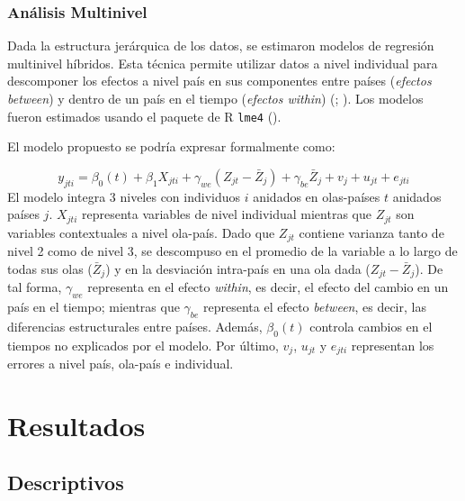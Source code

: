 \documentclass[
  spanish,
  letterpaper,
  DIV=11,
  numbers=noendperiod]{scrartcl}
\begin{document}
\subsubsection{Análisis Multinivel}\label{anuxe1lisis-multinivel}

Dada la estructura jerárquica de los datos, se estimaron modelos de
regresión multinivel híbridos. Esta técnica permite utilizar datos a
nivel individual para descomponer los efectos a nivel país en sus
componentes entre países (\emph{efectos between}) y dentro de un país en
el tiempo (\emph{efectos within})
(; ). Los
modelos fueron estimados usando el paquete de R \texttt{lme4}
().

El modelo propuesto se podría expresar formalmente como:

\[
y_{jti} = \beta_{0}(t) + \beta_{1}X_{jti} + \gamma_{we}(Z_{jt}-\bar{Z}_{j}) + \gamma_{be}\bar{Z}_{j} + v_j + u_{jt} + e_{jti}
\] El modelo integra 3 niveles con individuos \(i\) anidados en
olas-países \(t\) anidados países \(j\). \(X_{jti}\) representa
variables de nivel individual mientras que \(Z_{jt}\) son variables
contextuales a nivel ola-país. Dado que \(Z_{jt}\) contiene varianza
tanto de nivel 2 como de nivel 3, se descompuso en el promedio de la
variable a lo largo de todas sus olas (\(\bar{Z}_{j}\)) y en la
desviación intra-país en una ola dada (\(Z_{jt}-\bar{Z}_{j}\)). De tal
forma, \(\gamma_{we}\) representa en el efecto \emph{within}, es decir,
el efecto del cambio en un país en el tiempo; mientras que
\(\gamma_{be}\) representa el efecto \emph{between}, es decir, las
diferencias estructurales entre países. Además, \(\beta_{0}(t)\)
controla cambios en el tiempos no explicados por el modelo. Por último,
\(v_j\), \(u_{jt}\) y \(e_{jti}\) representan los errores a nivel país,
ola-país e individual.

\section{Resultados}\label{resultados}

\subsection{Descriptivos}\label{descriptivos}
\end{document}
